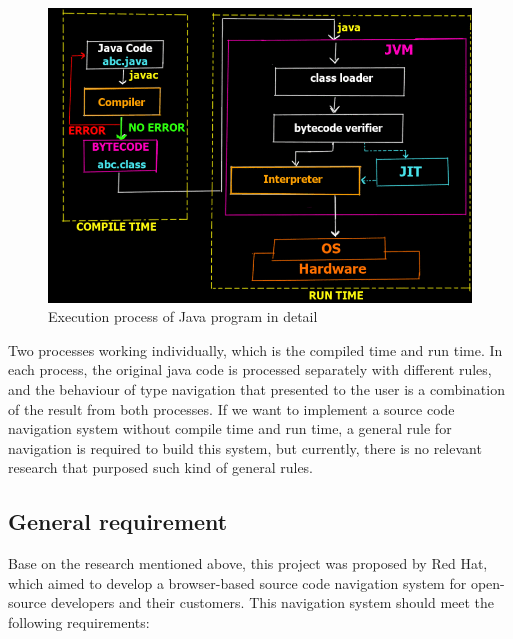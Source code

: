 \documentclass[runningheads]{llncs}
\begin{document}
\begin{figure}[H]
	\centering
	\includegraphics[width=12cm]{pic/java-execution-process.png}
	\caption{Execution process of Java program in detail\cite{java-execution-process}}
	\label{Execution process of Java program in detail}
\end{figure}

Two processes working individually, which is the compiled time and run time. In each process, the original java code is processed separately with different rules, and the behaviour of type navigation that presented to the user is a combination of the result from both processes. If we want to implement a source code navigation system without compile time and run time, a general rule for navigation is required to build this system, but currently, there is no relevant research that purposed such kind of general rules.

\subsection{General requirement}
Base on the research mentioned above, this project was proposed by Red Hat, which aimed to develop a browser-based source code navigation system for open-source developers and their customers. This navigation system should meet the following requirements:
\end{document}
